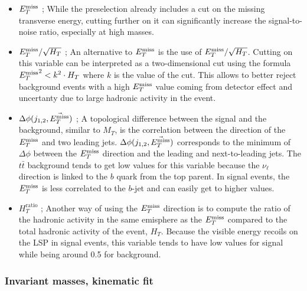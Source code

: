                 \begin{itemize}
                    \item  $E_T^\text{miss}$ ; While the preselection already includes a cut on the missing
                        transverse energy, cutting further on it can significantly increase the
                        signal-to-noise ratio, especially at high masses.
                    \item  $E_T^\text{miss} / \sqrt{H_T}$ ; An alternative to $E_T^\text{miss}$ is the use of $E_T^\text{miss} / \sqrt{H_T}$.
                        Cutting on this variable can be interpreted as a two-dimensional cut using
                        the formula ${E_T^\text{miss}}^{2} < k^2 \cdot H_T$ where $k$ is the value of the cut.
                        This allows to better reject background events with a high $E_T^\text{miss}$ value coming
                        from detector effect and uncertanty due to large hadronic activity in the event.
                    \item $\Delta \phi( j_{1,2}, \vec{E_T^\text{miss}} )$ ; A topological difference between the signal and the background, 
                        similar to $M_T$, is the correlation between the direction of the $E_T^\text{miss}$ and two leading jets. $\Delta 
                        \phi( j_{1,2}, \vec{E_T^\text{miss}} )$ corresponds to the minimum of $\Delta \phi$ between the $E_T^\text{miss}$ direction and 
                        the leading and next-to-leading jets. The $t\bar{t}$ background tends to get low values for this variable
                        because the $\nu_{\ell}$ direction is linked to the $b$ quark from the top parent. In signal events, 
                        the $E_T^\text{miss}$ is less correlated to the $b$-jet and can easily get to higher values.
                    \item $H_{T}^\text{ratio}$ ; Another way of using the $E_T^\text{miss}$ direction is to compute the ratio of the
                        hadronic activity in the same emisphere as the $E_T^\text{miss}$ compared to the total hadronic activity of the event,
                        $H_T$. Because the visible energy recoils on the LSP in signal events, this variable tends to have
                        low values for signal while being around 0.5 for background. 
                \end{itemize}

           \subsubsection{Invariant masses, kinematic fit}
           
